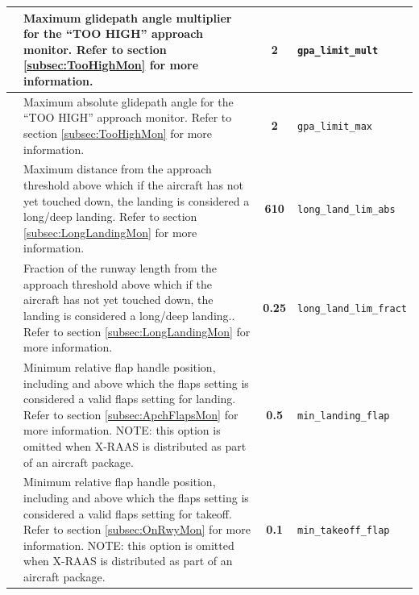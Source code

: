 \documentclass[a4paper,12pt]{article}
\newcommand{\confopt}[1]{\texttt{#1}}
\begin{document}
{\begin{center}
\begin{supertabular}{|c|p{8cm}|c|l|}
 &
Maximum glidepath angle multiplier for the ``TOO HIGH'' approach
monitor.\newline
Refer to section \ref{subsec:TooHighMon} for more information. &
\textbf{2} & \confopt{gpa\_limit\_mult} \\

\hline

 &
Maximum absolute glidepath angle for the ``TOO HIGH'' approach
monitor.\newline
Refer to section \ref{subsec:TooHighMon} for more information. &
\textbf{2} & \confopt{gpa\_limit\_max} \\

\hline

 &
Maximum distance from the approach threshold above which if the aircraft
has not yet touched down, the landing is considered a long/deep
landing.\newline
Refer to section \ref{subsec:LongLandingMon} for more information. &
\textbf{610} & \confopt{long\_land\_lim\_abs} \\

\hline

 &
Fraction of the runway length from the approach threshold above which if
the aircraft has not yet touched down, the landing is considered a
long/deep landing..\newline
Refer to section \ref{subsec:LongLandingMon} for more information. &
\textbf{0.25} & \confopt{long\_land\_lim\_fract} \\

\hline

 &
Minimum relative flap handle position, including and above which the
flaps setting is considered a valid flaps setting for landing.\newline
Refer to section \ref{subsec:ApchFlapsMon} for more information.\newline
NOTE: this option is omitted when X-RAAS is distributed as part of an
aircraft package. &
\textbf{0.5} & \confopt{min\_landing\_flap} \\

\hline

 &
Minimum relative flap handle position, including and above which the
flaps setting is considered a valid flaps setting for takeoff.\newline
Refer to section \ref{subsec:OnRwyMon} for more information.\newline
NOTE: this option is omitted when X-RAAS is distributed as part of an
aircraft package. &
\textbf{0.1} & \confopt{min\_takeoff\_flap} \\


\end{supertabular}
\end{center}}
\end{document}
